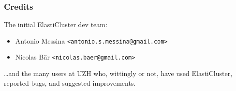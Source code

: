 \documentclass[english,serif,mathserif,usenames,dvipsnames]{beamer}
\begin{document}
\begin{frame}
  \frametitle{Credits}

  The initial ElastiCluster dev team:
  \begin{itemize}
  \item Antonio Messina \texttt{<antonio.s.messina@gmail.com>}
  \item Nicolas B\"ar \texttt{<nicolas.baer@gmail.com>}
  \end{itemize}



  \ldots and the many users at UZH who, wittingly or not, have used
  ElastiCluster, reported bugs, and suggested improvements.

\end{frame}
\end{document}
